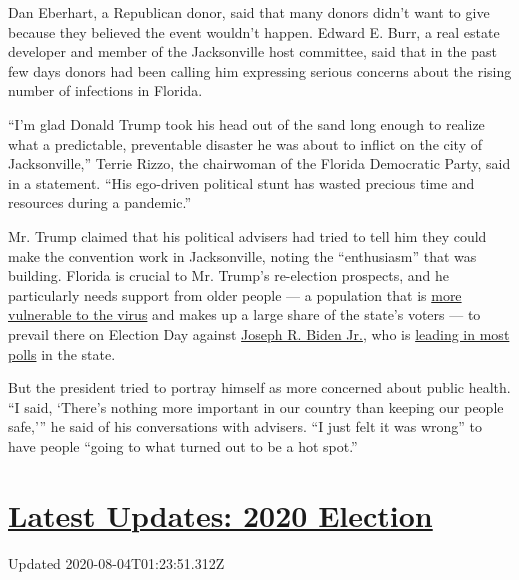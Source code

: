 Dan Eberhart, a Republican donor, said that many donors didn't want to
give because they believed the event wouldn't happen. Edward E. Burr, a
real estate developer and member of the Jacksonville host committee,
said that in the past few days donors had been calling him expressing
serious concerns about the rising number of infections in Florida.

``I'm glad Donald Trump took his head out of the sand long enough to
realize what a predictable, preventable disaster he was about to inflict
on the city of Jacksonville,'' Terrie Rizzo, the chairwoman of the
Florida Democratic Party, said in a statement. ``His ego-driven
political stunt has wasted precious time and resources during a
pandemic.''

Mr. Trump claimed that his political advisers had tried to tell him they
could make the convention work in Jacksonville, noting the
``enthusiasm'' that was building. Florida is crucial to Mr. Trump's
re-election prospects, and he particularly needs support from older
people --- a population that is
\href{https://www.nytimes.com/2020/07/20/us/coronavirus-florida-elderly.html}{more
vulnerable to the virus} and makes up a large share of the state's
voters --- to prevail there on Election Day against
\href{https://www.nytimes.com/interactive/2020/us/elections/joe-biden.html}{Joseph
R. Biden Jr.}, who is
\href{https://www.realclearpolitics.com/epolls/2020/president/fl/florida_trump_vs_biden-6841.html\#polls}{leading
in most polls} in the state.

But the president tried to portray himself as more concerned about
public health. ``I said, `There's nothing more important in our country
than keeping our people safe,''' he said of his conversations with
advisers. ``I just felt it was wrong'' to have people ``going to what
turned out to be a hot spot.''

\hypertarget{latest-updates-2020-election}{%
\section{\texorpdfstring{\href{https://www.nytimes.com/2020/08/03/us/elections/biden-vs-trump.html?action=click\&pgtype=Article\&state=default\&region=MAIN_CONTENT_1\&context=storylines_live_updates}{Latest
Updates: 2020
Election}}{Latest Updates: 2020 Election}}\label{latest-updates-2020-election}}

Updated 2020-08-04T01:23:51.312Z

